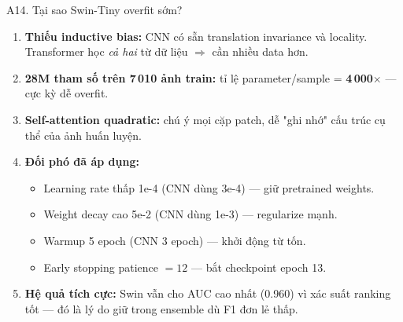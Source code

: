 \documentclass[10pt, aspectratio=169]{beamer}
\begin{document}
\begin{frame}{A14. Tại sao Swin-Tiny overfit sớm?}
    \footnotesize
    \begin{enumerate}
        \item \textbf{Thiếu inductive bias:} CNN có sẵn translation invariance và locality. Transformer học \textit{cả hai} từ dữ liệu $\Rightarrow$ cần nhiều data hơn.
        \item \textbf{28M tham số trên 7\,010 ảnh train:} tỉ lệ parameter/sample = \textbf{4\,000$\times$} --- cực kỳ dễ overfit.
        \item \textbf{Self-attention quadratic:} chú ý mọi cặp patch, dễ "ghi nhớ" cấu trúc cụ thể của ảnh huấn luyện.
        \item \textbf{Đối phó đã áp dụng:}
        \begin{itemize}\scriptsize
            \item Learning rate thấp 1e-4 (CNN dùng 3e-4) --- giữ pretrained weights.
            \item Weight decay cao 5e-2 (CNN dùng 1e-3) --- regularize mạnh.
            \item Warmup 5 epoch (CNN 3 epoch) --- khởi động từ tốn.
            \item Early stopping patience $= 12$ --- bắt checkpoint epoch 13.
        \end{itemize}
        \item \textbf{Hệ quả tích cực:} Swin vẫn cho AUC cao nhất (0.960) vì xác suất ranking tốt --- đó là lý do giữ trong ensemble dù F1 đơn lẻ thấp.
    \end{enumerate}
\end{frame}
\end{document}
